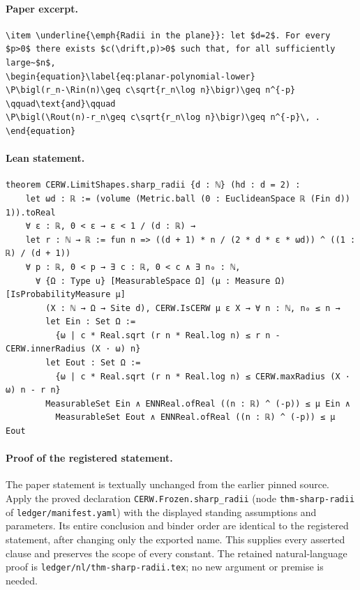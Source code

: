 \paragraph{Paper excerpt.}
\begin{verbatim}
\item \underline{\emph{Radii in the plane}}: let $d=2$. For every $p>0$ there exists $c(\drift,p)>0$ such that, for all sufficiently large~$n$,
\begin{equation}\label{eq:planar-polynomial-lower}
\P\bigl(r_n-\Rin(n)\geq c\sqrt{r_n\log n}\bigr)\geq n^{-p}
\qquad\text{and}\qquad
\P\bigl(\Rout(n)-r_n\geq c\sqrt{r_n\log n}\bigr)\geq n^{-p}\, .
\end{equation}
\end{verbatim}
\paragraph{Lean statement.}
\begin{verbatim}
theorem CERW.LimitShapes.sharp_radii {d : ℕ} (hd : d = 2) :
    let ωd : ℝ := (volume (Metric.ball (0 : EuclideanSpace ℝ (Fin d)) 1)).toReal
    ∀ ε : ℝ, 0 < ε → ε < 1 / (d : ℝ) →
    let r : ℕ → ℝ := fun n => ((d + 1) * n / (2 * d * ε * ωd)) ^ ((1 : ℝ) / (d + 1))
    ∀ p : ℝ, 0 < p → ∃ c : ℝ, 0 < c ∧ ∃ n₀ : ℕ,
      ∀ {Ω : Type u} [MeasurableSpace Ω] (μ : Measure Ω) [IsProbabilityMeasure μ]
        (X : ℕ → Ω → Site d), CERW.IsCERW μ ε X → ∀ n : ℕ, n₀ ≤ n →
        let Ein : Set Ω :=
          {ω | c * Real.sqrt (r n * Real.log n) ≤ r n - CERW.innerRadius (X · ω) n}
        let Eout : Set Ω :=
          {ω | c * Real.sqrt (r n * Real.log n) ≤ CERW.maxRadius (X · ω) n - r n}
        MeasurableSet Ein ∧ ENNReal.ofReal ((n : ℝ) ^ (-p)) ≤ μ Ein ∧
          MeasurableSet Eout ∧ ENNReal.ofReal ((n : ℝ) ^ (-p)) ≤ μ Eout
\end{verbatim}
\paragraph{Proof of the registered statement.}
The paper statement is textually unchanged from the earlier pinned source.
Apply the proved declaration \texttt{CERW.Frozen.sharp\_radii}
(node \texttt{thm-sharp-radii} of \texttt{ledger/manifest.yaml}) with the displayed
standing assumptions and parameters. Its entire conclusion and binder order
are identical to the registered statement, after changing only the exported
name. This supplies every asserted clause and preserves the scope of every
constant. The retained natural-language proof is
\texttt{ledger/nl/thm-sharp-radii.tex}; no new argument or premise is needed.
